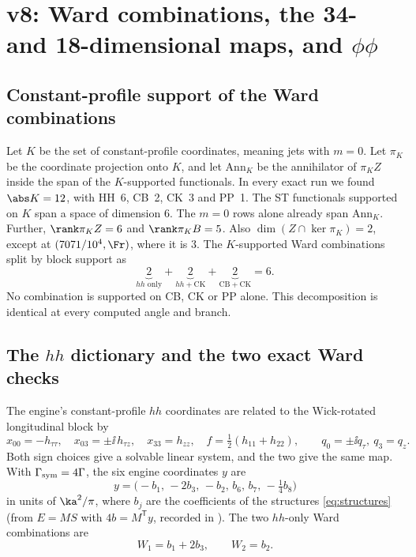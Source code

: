 
\section{v8: Ward combinations, the 34- and 18-dimensional maps, and \texorpdfstring{\(\phi\phi\)}{phi phi}}
\label{sec:v8map}

\subsection{Constant-profile support of the Ward combinations}

Let \(K\) be the set of constant-profile coordinates, meaning jets
with \(m=0\). Let \(\pi_K\) be the coordinate projection onto
\(K\), and let \(\mathrm{Ann}_K\) be the annihilator of \(\pi_K Z\)
inside the span of the \(K\)-supported functionals. In every exact
run we found \(\abs K=12\), with HH~6, CB~2, CK~3 and PP~1. The
ST functionals supported on \(K\) span a space of dimension
\(6\). The \(m=0\) rows alone already span \(\mathrm{Ann}_K\).
Further, \(\rank\pi_KZ=6\) and \(\rank\pi_KB=5\). Also
\(\dim(Z\cap\ker\pi_K)=2\), except at \((7071/10^4,\Fr)\), where it
is \(3\).
The \(K\)-supported Ward combinations split by block support as
\[
 \underbrace{2}_{hh\text{ only}}+\underbrace{2}_{hh+\mathrm{CK}}
 +\underbrace{2}_{\mathrm{CB}+\mathrm{CK}}=6.
\]
No combination is supported on CB, CK or PP alone.
This decomposition is identical at every computed angle and
branch.

\subsection{The \texorpdfstring{\(hh\)}{hh} dictionary and the two exact Ward checks}

The engine's constant-profile \(hh\) coordinates are related to
the Wick-rotated longitudinal block by
\[
 x_{00}=-h_{\tau\tau},\quad x_{03}=\pm\ii\,h_{\tau z},\quad
 x_{33}=h_{zz},\quad f=\tfrac12(h_{11}+h_{22}),\qquad
 q_0=\pm\ii q_\tau,\ q_3=q_z.
\]
Both sign choices give a solvable linear system, and the two
give the same map. With
\(\Gamma_{\rm sym}=4\Gamma\), the six engine coordinates
\(y\) are
\[
 y=\bigl(-b_1,\,-2b_3,\,-b_2,\,b_6,\,b_7,\,-\tfrac14 b_8\bigr)
\]
in units of \(\ka^2/\pi\), where \(b_j\) are the coefficients of the
structures \eqref{eq:structures}
(from \(E=MS\) with \(4b=M^{\mathsf T}y\), recorded in
).
The two \(hh\)-only Ward combinations are
\[
 W_1=b_1+2b_3,\qquad W_2=b_2 .
\]

